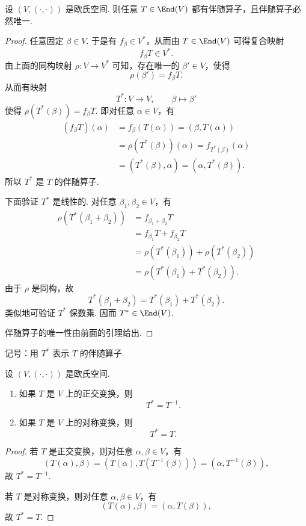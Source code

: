 \begin{corollary}
	设 $(V,(\cdot,\cdot))$ 是欧氏空间. 则任意 $T\in\End(V)$ 都有伴随算子，且伴随算子必然唯一.
\end{corollary}
\begin{proof}
	任意固定 $\beta\in V$. 于是有 $f_\beta\in V^*$，从而由 $T\in\End(V)$ 可得复合映射
	\[
	f_\beta T\in V^*.
	\]
	由上面的同构映射 $\rho:V\to V^*$ 可知，存在唯一的 $\beta'\in V$，使得
	\[
	\rho(\beta')=f_\beta T.
	\]
	从而有映射
	\[
	T^*:V\longrightarrow V,
	\qquad
	\beta\longmapsto \beta'
	\]
	使得 $\rho(T^*(\beta))=f_\beta T$. 即对任意 $\alpha\in V$，有
	\[
	\begin{aligned}
		(f_\beta T)(\alpha)
		&=f_\beta(T(\alpha))=(\beta,T(\alpha))\\
		&=\rho(T^*(\beta))(\alpha)=f_{T^*(\beta)}(\alpha)\\
		&=(T^*(\beta),\alpha)=(\alpha,T^*(\beta)).
	\end{aligned}
	\]
	所以 $T^*$ 是 $T$ 的伴随算子.
	
	下面验证 $T^*$ 是线性的. 对任意 $\beta_1,\beta_2\in V$，有
	\[
	\begin{aligned}
		\rho(T^*(\beta_1+\beta_2))
		&=f_{\beta_1+\beta_2}T\\
		&=f_{\beta_1}T+f_{\beta_2}T\\
		&=\rho(T^*(\beta_1))+\rho(T^*(\beta_2))\\
		&=\rho(T^*(\beta_1)+T^*(\beta_2)).
	\end{aligned}
	\]
	由于 $\rho$ 是同构，故
	\[
	T^*(\beta_1+\beta_2)=T^*(\beta_1)+T^*(\beta_2).
	\]
	类似地可验证 $T^*$ 保数乘. 因而 $T^*\in\End(V)$.
	
	伴随算子的唯一性由前面的引理给出.
\end{proof}

记号：用 $T^*$ 表示 $T$ 的伴随算子.

\begin{example}
	设 $(V,(\cdot,\cdot))$ 是欧氏空间.
	\begin{enumerate}
		\item 如果 $T$ 是 $V$ 上的正交变换，则
		\[
		T^*=T^{-1}.
		\]
		\item 如果 $T$ 是 $V$ 上的对称变换，则
		\[
		T^*=T.
		\]
	\end{enumerate}
\end{example}
\begin{proof}
	若 $T$ 是正交变换，则对任意 $\alpha,\beta\in V$，有
	\[
	(T(\alpha),\beta)=(T(\alpha),T(T^{-1}(\beta)))=(\alpha,T^{-1}(\beta)),
	\]
	故 $T^*=T^{-1}$.
	
	若 $T$ 是对称变换，则对任意 $\alpha,\beta\in V$，有
	\[
	(T(\alpha),\beta)=(\alpha,T(\beta)),
	\]
	故 $T^*=T$.
\end{proof}

